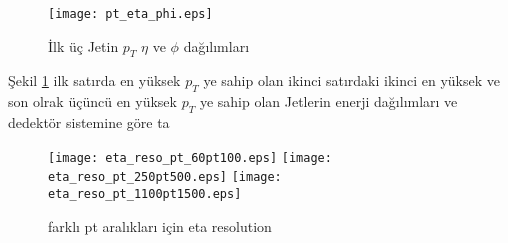 \begin{figure}[!htpb] 
\centering
\texttt{[image: pt\_eta\_phi.eps]}
\caption{İlk üç Jetin $p_T$ $\eta$ ve $\phi$ dağılımları}
\label{fig:ptetaphi}
\end{figure}
\par Şekil \ref{fig:ptetaphi} ilk satırda en yüksek $p_T$ ye sahip olan ikinci satırdaki ikinci en yüksek ve son olrak üçüncü en yüksek $p_T$ ye sahip olan Jetlerin enerji dağılımları ve dedektör sistemine göre ta
\begin{figure}[!htpb] 
\centering
\texttt{[image: eta\_reso\_pt\_60pt100.eps]}
\texttt{[image: eta\_reso\_pt\_250pt500.eps]}
\texttt{[image: eta\_reso\_pt\_1100pt1500.eps]}
\caption{farklı pt aralıkları için eta resolution}
\end{figure}


